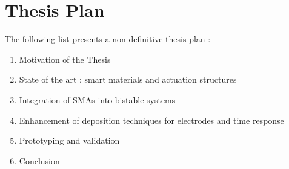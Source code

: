\section{Thesis Plan}
The following list presents a non-definitive thesis plan :
\begin{enumerate}
  \item Motivation of the Thesis
  \item State of the art : smart materials and actuation structures
  \item Integration of SMAs into bistable systems
  \item Enhancement of deposition techniques for electrodes and time response 
  \item Prototyping and validation
  \item Conclusion
\end{enumerate}
